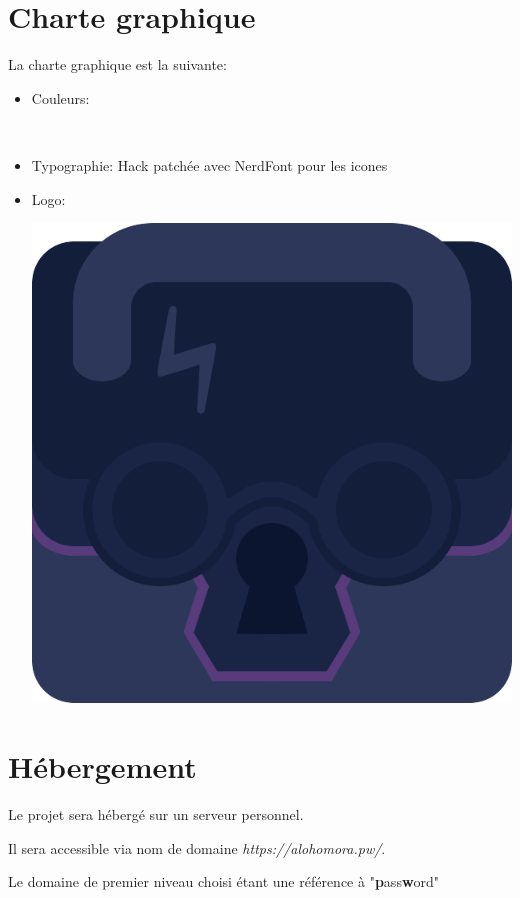 \documentclass[oneside]{report}
\newcommand{\writecol}[1]{
	\subitem{\textcolor[HTML]{#1}{\# #1}}
}
\begin{document}
	\section{Charte graphique}
	{
		\par La charte graphique est la suivante:\\
		\begin{itemize}
			\item Couleurs:
				\writecol{0C1530}
				\writecol{131e3b}
				\writecol{1A2546}
				\writecol{573b7a}
				\writecol{2C375A}
				\writecol{016937}
				\writecol{06a75b}\\
			\item Typographie: Hack patchée avec NerdFont pour les icones\\
			\item{Logo:}\\
				\par\includegraphics[scale=.125]{logo}
		\end{itemize}
	}

	\section{Hébergement}
	{
		\par Le projet sera hébergé sur un serveur personnel.
		\par Il sera accessible via nom de domaine \textit{https://alohomora.pw/}.
		\par Le domaine de premier niveau choisi étant une référence à "\textbf{p}ass\textbf{w}ord"
	}
\end{document}
